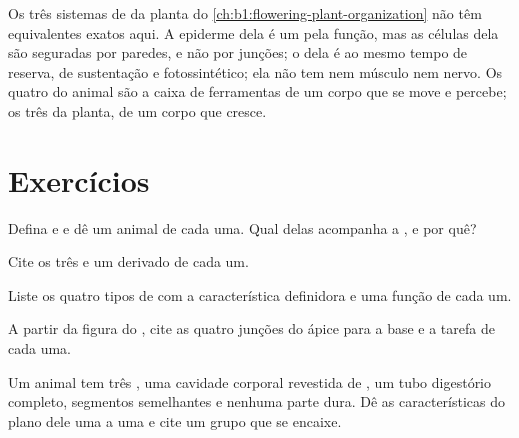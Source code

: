 \begin{remark}\label{rem:b1:body-plans-tissues:plants}
Os três sistemas de  da planta do
\cref{ch:b1:flowering-plant-organization} não têm equivalentes exatos
aqui. A epiderme dela é um  pela função, mas as células dela são
seguradas por paredes, e não por junções; o  dela é ao
mesmo tempo de reserva, de sustentação e fotossintético; ela não tem
nem músculo nem nervo. Os quatro  do animal são a caixa de
ferramentas de um corpo que se move e percebe; os três da planta, de um
corpo que cresce.
\end{remark}

\section{Exercícios}

\begin{exercise}[$\star$]\label{exo:b1:body-plans-tissues:1}
Defina  e  e dê um animal de cada uma.
Qual delas acompanha a , e por quê?
\end{exercise}

\begin{exercise}[$\star$]\label{exo:b1:body-plans-tissues:2}
Cite os três  e um  derivado de cada um.
\end{exercise}

\begin{exercise}[$\star$]\label{exo:b1:body-plans-tissues:3}
Liste os quatro tipos de  com a característica definidora e uma
função de cada um.
\end{exercise}

\begin{exercise}[$\star$]\label{exo:b1:body-plans-tissues:4}
A partir da figura do , cite as quatro junções do ápice para a
base e a tarefa de cada uma.
\end{exercise}

\begin{exercise}[$\star\star$]\label{exo:b1:body-plans-tissues:5}
Um animal tem três , uma cavidade corporal
revestida de , um tubo digestório completo, segmentos
semelhantes e nenhuma parte dura. Dê as características do plano dele
uma a uma e cite um grupo que se encaixe.
\end{exercise}

